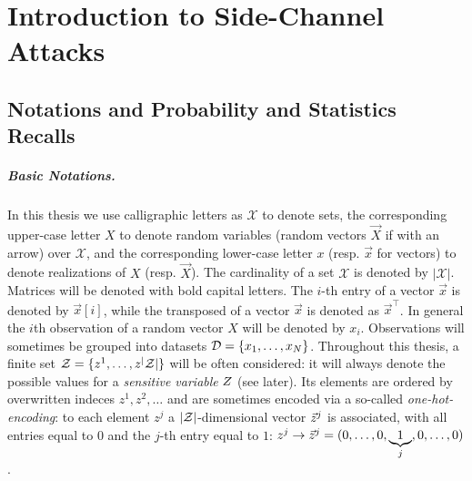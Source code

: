 \chapter{Introduction to Side-Channel Attacks} %

\label{ChapterIntroductionSCA}

\section{Notations and Probability and Statistics Recalls}\label{sec:notations}
\paragraph*{Basic Notations.}
In this thesis we use calligraphic letters as $\mathcal{X}$ to denote
sets, the corresponding upper-case letter $X$ to denote random variables (random
vectors $\vec{X}$ if with an arrow) over $\mathcal{X}$, and the corresponding
lower-case letter $x$ (resp. $\vec{x}$ for vectors) to denote realizations of
$X$ (resp. $\vec{X}$). The cardinality of a set $\mathcal{X}$ is denoted by $\lvert\mathcal{X}\rvert$. Matrices will be denoted with bold capital letters. The
$i$-th entry of a vector $\vec{x}$ is denoted by $\vec{x}[i]$, while the transposed of a vector $\vec{x}$ is denoted as $\vec{x}^\intercal$. In general the $i$th observation of a random vector $X$ will be denoted by $x_i$. Observations will sometimes be grouped into datasets $\mathcal{D}=\{x_1,\dots, x_N\}$. Throughout this thesis, a finite set $\mathcal{Z} = \{z^1, \dots, z^\lvert\mathcal{Z}\rvert\}$ will be often considered: it will always denote the possible values for a \emph{sensitive variable} $Z$ (see later). Its elements are ordered by overwritten indeces $z^1, z^2,\dots$ and are sometimes encoded via a so-called \emph{one-hot-encoding}: to each element $z^j$ a $\lvert\mathcal{Z}\rvert$-dimensional vector  $\vec{z}^j$ is associated,
with all entries equal to $0$ and the $j$-th entry equal to $1$: $z^j
\rightarrow \vec{z}^j = (0,\ldots , 0,\underbrace{1}_{j},0,\dots,0)$.

